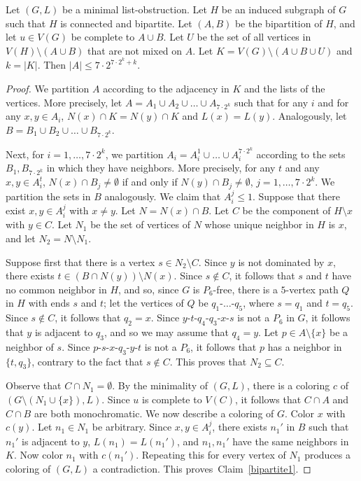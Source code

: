 \documentclass[11pt]{article}
\begin{document}
\begin{claim}\label{bipartite1}
Let $(G,L)$ be a minimal list-obstruction.
Let $H$ be an induced subgraph of $G$ such that $H$ is connected and bipartite. 
Let $(A,B)$ be the bipartition of $H$, and let $u \in V(G)$ be complete to $A \cup B$.  Let $U$ be the set of all vertices in $V(H) \setminus (A \cup B)$ 
that are not mixed on $A$. Let $K= V(G) \setminus (A \cup B \cup U)$ and 
$k=|K|$. Then $|A|\leq  7\cdot 2^{7\cdot 2^k+k}$.
\end{claim}
\begin{proof}
We partition $A$ according to the adjacency in $K$ and the lists of the vertices. 
More precisely, let $A=A_1\cup A_2\cup\ldots \cup A_{7\cdot 2^k}$ such that for any $i$ and for any $x,y\in A_i$, $N(x)\cap K=N(y)\cap K$ and $ L(x)=L(y)$.
Analogously, let $B=B_1\cup B_2\cup\ldots \cup B_{7\cdot 2^k}$. 

Next, for $i = 1,\ldots,7\cdot 2^k$, we partition $A_i=A_i^1\cup\ldots \cup A_i^{ 7\cdot 2^k}$ according to the sets $B_1, B_{7\cdot 2^k}$ in which they have neighbors. 
More precisely, for any $t$ and any $x,y\in A_i^t$, $N(x)\cap B_j\neq \emptyset$ if and only if $N(y)\cap B_j\neq \emptyset$, $j = 1,\ldots,7\cdot 2^k$. 
We partition the sets in $B$ analogously. 
We claim that $A_i^j \leq 1$.
Suppose that there exist $x,y\in A_i^j$ with $x\neq y$. Let $N=N(x) \cap B$.   
Let $C$ be the component of $H \setminus x$ with $y \in C$. 
Let $N_1$ be the  set of vertices of $N$ whose unique neighbor in $H$ is $x$, and let $N_2=N \setminus N_1$.   

Suppose first that there is a vertex $s \in N_2 \setminus C$. 
Since  $y$ is not dominated by $x$, there exists $t\in (B\cap N(y))\setminus N(x)$. 
Since $s \not \in C$, it follows that $s$ and $t$ have no common neighbor in $H$, and so, since $G$ is $P_6$-free, there is a $5$-vertex path $Q$ in $H$ with ends
$s$ and $t$; let the vertices of $Q$ be $q_1$-$\ldots$-$q_5$, where $s=q_1$ and $t=q_5$.
Since $s \not \in C$, it follows that $q_2=x$.
Since $y$-$t$-$q_4$-$q_3$-$x$-$s$ is not a $P_6$ in $G$, it follows that $y$ is adjacent to $q_3$, and so we may assume that $q_4=y$.
Let $p \in A \setminus \{x\}$ be a neighbor of $s$. 
Since $p$-$s$-$x$-$q_3$-$y$-$t$ is not a $P_6$, it follows that $p$ has a neighbor in $\{t,q_3\}$, contrary to the fact that $s \not \in C$. 
This proves that $N_2 \subseteq C$.

Observe that  $C \cap N_1 = \emptyset$. 
By the minimality of $(G,L)$, there is a coloring $c$ of $(G\setminus (N_1 \cup \{x\}), L)$. 
Since $u$ is complete to $V(C)$, it follows that $C\cap A$ and $C \cap B$ are both monochromatic. 
We now describe a coloring of $G$. 
Color $x$ with $c(y)$.
Let $n_1 \in N_1$ be arbitrary.
Since $x,y \in A_i^j$, there exists $n_1'$ in $B$ such that $n_1'$ is adjacent to $y$, $L(n_1)=L(n_1')$, and $n_1,n_1'$ have the same neighbors in $K$. 
Now color $n_1$ with $c(n_1')$.
Repeating this for every vertex of $N_1$ produces a coloring of $(G,L)$ a contradiction. 
This proves~Claim~\ref{bipartite1}.
\end{proof}
\end{document}

